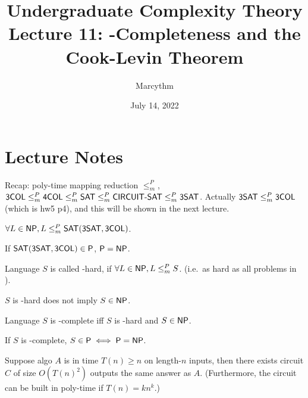\documentclass{article}
\title{Undergraduate Complexity Theory \\ Lecture 11: \NP-Completeness and the Cook-Levin Theorem}
\author{Marcythm}
\date{July 14, 2022}
\begin{document}
\maketitle{}

\section{Lecture Notes}

Recap: poly-time mapping reduction \(\leq_m^P\), \( \text{\sf 3COL} \leq_m^P \text{\sf 4COL} \leq_m^P \text{\sf SAT} \leq_m^P \text{\sf CIRCUIT-SAT} \leq_m^P \text{\sf 3SAT} \).
Actually \(\text{\sf 3SAT} \leq_m^P \text{\sf 3COL}\) (which is hw5 p4), and this will be shown in the next lecture.

\begin{theorem}
  \( \forall L \in \text{\sf NP}, L \leq_m^P \text{\sf SAT} (\text{\sf 3SAT}, \text{\sf 3COL}) \).
\end{theorem}

\begin{corollary}
  If \(\text{\sf SAT} (\text{\sf 3SAT}, \text{\sf 3COL}) \in \text{\sf P}\), \(\text{\sf P} = \text{\sf NP}\).
\end{corollary}

\begin{definition}
  Language \(S\) is called \NP-hard, if \(\forall L \in \text{\sf NP}, L \leq_m^P S\). (i.e.\ as hard as all problems in \NP).
\end{definition}

\begin{remark}
  \(S\) is \NP-hard does not imply \(S \in \text{\sf NP}\).
\end{remark}

\begin{definition}
  Language \(S\) is \NP-complete iff \(S\) is \NP-hard and \(S \in \text{\sf NP}\).
\end{definition}

\begin{theorem}
  If \(S\) is \NP-complete, \( S \in \text{\sf P} \iff \text{\sf P} = \text{\sf NP} \).
\end{theorem}

\begin{theorem}
  Suppose algo \(A\) is in time \(T(n) \geq n\) on length-\(n\) inputs, then there exists circuit \(C\) of size \(O(T(n)^2)\) outputs the same answer as \(A\). (Furthermore, the circuit can be built in poly-time if \(T(n) = kn^k\).)
\end{theorem}
\end{document}
